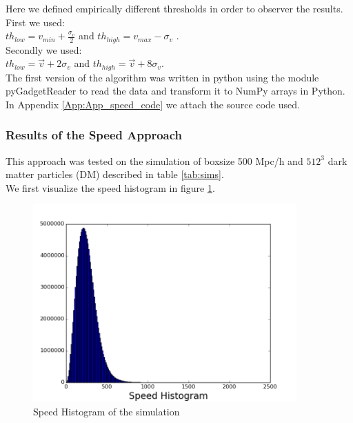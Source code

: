 \documentclass[12pt]{article}
\begin{document}
Here we defined empirically different thresholds
 in order to observer the results. \\
First we used:  \\
$th_{low} = v_{min} + \frac{\sigma_{v}}{2} $ and
 $th_{high} = v_{max}  - \sigma_{v}$ .\\
Secondly we used: \\
$th_{low} = \vec{v} + 2  \sigma_{v} $ and $th_{high} = \vec{v}  +  8 \sigma_{v}$.\\

The first version of the algorithm was written in
 python using the module
pyGadgetReader
 \cite{thompson_pygadgetreader_2014ascl_soft11001T}
  to read the
data and transform it to NumPy arrays in Python.
 In Appendix \ref{App:App_speed_code} we attach
  the source code used.

\subsubsection{Results of the Speed Approach}
This approach was tested on the simulation of
 boxsize 500 Mpc/h
and $512^{3}$ dark matter particles (DM) described
 in table \ref{tab:sims}. \\

We first visualize the speed histogram in figure
 \ref{fg:hist_vel}.\\

\begin{figure}[ht]
\begin{center}
\includegraphics[width=0.9\textwidth]{graphs/hist_vel.png} %
\caption{Speed Histogram of the simulation}
\label{fg:hist_vel}
\end{center}
\end{figure}
\FloatBarrier
\end{document}
